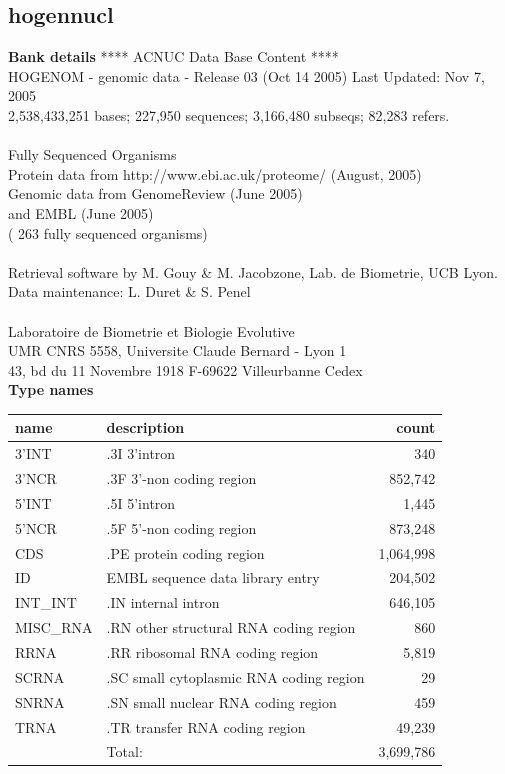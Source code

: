 \documentclass{article}
\begin{document}
\begin{Schunk}
\section{ hogennucl }
\textbf{Bank details}
               ****     ACNUC Data Base Content      ****                      \\
  HOGENOM - genomic data - Release 03 (Oct 14 2005) Last Updated: Nov  7, 2005\\
2,538,433,251 bases; 227,950 sequences; 3,166,480 subseqs; 82,283 refers.\\
                                                                               \\
                        Fully Sequenced Organisms\\
   Protein data from http://www.ebi.ac.uk/proteome/ (August, 2005)\\
          Genomic data from GenomeReview  (June 2005) \\
                  and  EMBL (June 2005)\\
	   ( 263 fully sequenced organisms)\\
\\
Retrieval software by M. Gouy \& M. Jacobzone, Lab. de Biometrie, UCB Lyon.\\
Data maintenance: L. Duret \& S. Penel\\
\\
Laboratoire de Biometrie et Biologie Evolutive\\
UMR CNRS 5558, Universite Claude Bernard - Lyon 1 \\
43, bd du 11 Novembre 1918 F-69622 Villeurbanne Cedex\\


\textbf{Type names}
\noindent\begin{tabular}{llr}
\hline \hline
name & description & count \\
\hline
3'INT  &  .3I 3'intron  &  340 \\
3'NCR  &  .3F  3'-non coding region  &  852,742 \\
5'INT  &  .5I 5'intron  &  1,445 \\
5'NCR  &  .5F  5'-non coding region  &  873,248 \\
CDS  &  .PE protein coding region  &  1,064,998 \\
ID  &  EMBL sequence data library entry  &  204,502 \\
INT\_INT  &  .IN  internal intron  &  646,105 \\
MISC\_RNA  &  .RN other structural RNA coding region  &  860 \\
RRNA  &  .RR ribosomal RNA coding region  &  5,819 \\
SCRNA  &  .SC small cytoplasmic RNA coding region  &  29 \\
SNRNA  &  .SN small nuclear RNA coding region  &  459 \\
TRNA  &  .TR transfer RNA coding region  &  49,239 \\
\hline
 & Total: & 3,699,786 \\
\hline \hline
\end{tabular}


\end{Schunk}
\end{document}
